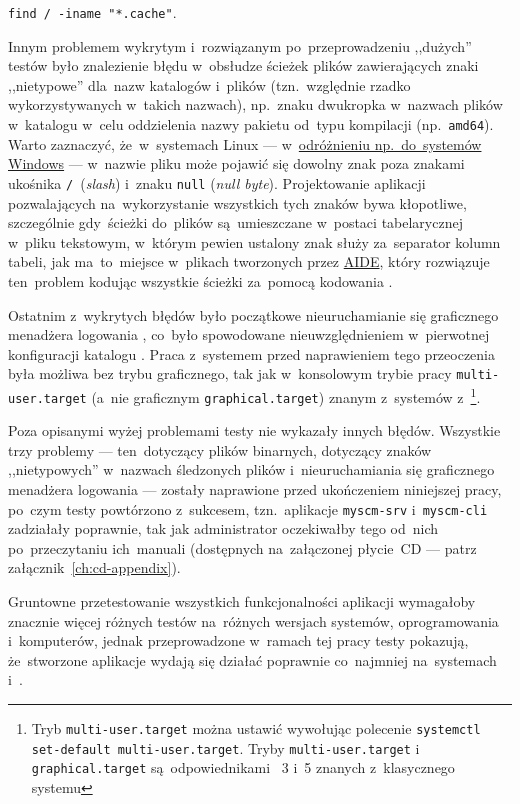 \documentclass[thesis]{subfiles}
\begin{document}
\begin{center}
	\texttt{find / -iname "*.cache"}.
\end{center}

Innym problemem wykrytym i~rozwiązanym po~przeprowadzeniu ,,dużych'' testów było znalezienie błędu w~obsłudze ścieżek plików zawierających znaki ,,nietypowe'' dla~nazw katalogów i~plików (tzn.~względnie rzadko wykorzystywanych w~takich nazwach), np.~znaku dwukropka w~nazwach plików w~katalogu  w~celu oddzielenia nazwy pakietu od~typu kompilacji (np.~\texttt{amd64}). Warto zaznaczyć, że~w~systemach Linux --- w~\href{https://stackoverflow.com/questions/1976007/what-characters-are-forbidden-in-windows-and-linux-directory-names}{odróżnieniu np.~do~systemów Windows} --- w~nazwie pliku może pojawić się dowolny znak poza znakami ukośnika \texttt{/}~(\emph{slash}) i~znaku \texttt{null} (\emph{null byte}). Projektowanie aplikacji pozwalających na~wykorzystanie wszystkich tych znaków bywa kłopotliwe, szczególnie gdy~ścieżki do~plików są~umieszczane w~postaci tabelarycznej w~pliku tekstowym, w~którym pewien ustalony znak służy za~separator kolumn tabeli, jak ma~to~miejsce w~plikach tworzonych przez \hyperlink{sec:aide}{AIDE}, który rozwiązuje ten~problem kodując wszystkie ścieżki za~pomocą kodowania .

Ostatnim z~wykrytych błędów było początkowe nieuruchamianie się graficznego menadżera logowania , co~było spowodowane nieuwzględnieniem w~pierwotnej konfiguracji \texttt{\srvappname} katalogu . Praca z~systemem przed naprawieniem tego przeoczenia była możliwa bez trybu graficznego, tak jak w~konsolowym trybie pracy \texttt{multi-user.target} (a~nie graficznym \texttt{graphical.target}) znanym z~systemów z~\footnote{Tryb \texttt{multi-user.target} można ustawić wywołując polecenie \texttt{systemctl set-default multi-user.target}. Tryby \texttt{multi-user.target} i \texttt{graphical.target} są~odpowiednikami ~3 i~5 znanych z~klasycznego systemu }.

Poza opisanymi wyżej problemami testy nie wykazały innych błędów. Wszystkie trzy problemy --- ten~dotyczący plików binarnych, dotyczący znaków ,,nietypowych'' w~nazwach śledzonych plików i~nieuruchamiania się graficznego menadżera logowania --- zostały naprawione przed ukończeniem niniejszej pracy, po~czym testy powtórzono z~sukcesem, tzn.~aplikacje \texttt{myscm-srv} i~\texttt{myscm-cli} zadziałały poprawnie, tak jak administrator oczekiwałby tego od~nich po~przeczytaniu ich~manuali (dostępnych na~załączonej płycie~CD --- patrz załącznik~\ref{ch:cd-appendix}).

Gruntowne przetestowanie wszystkich funkcjonalności aplikacji wymagałoby znacznie więcej różnych testów na~różnych wersjach systemów, oprogramowania i~komputerów, jednak przeprowadzone w~ramach tej pracy testy pokazują, że~stworzone aplikacje wydają się działać poprawnie co~najmniej na~systemach \linuxdebian{} i~\linuxarch{}.
\end{document}
